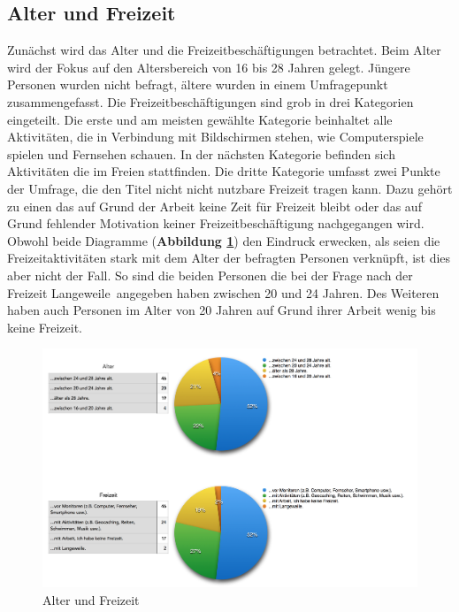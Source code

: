 \subsection{Alter und Freizeit} 
Zunächst wird das Alter und die Freizeitbeschäftigungen betrachtet. Beim Alter wird der Fokus auf den Altersbereich von 16 bis 28 Jahren gelegt. Jüngere Personen wurden nicht befragt, ältere wurden in einem Umfragepunkt zusammengefasst. Die Freizeitbeschäftigungen sind grob in drei Kategorien eingeteilt. Die erste und am meisten gewählte Kategorie beinhaltet alle Aktivitäten, die in Verbindung mit Bildschirmen stehen, wie Computerspiele spielen und Fernsehen schauen. In der nächsten Kategorie befinden sich Aktivitäten die im Freien stattfinden. Die dritte Kategorie umfasst zwei Punkte der Umfrage, die den Titel nicht nicht nutzbare Freizeit tragen kann. Dazu gehört zu einen das auf Grund der Arbeit keine Zeit für Freizeit bleibt oder das auf Grund fehlender Motivation keiner Freizeitbeschäftigung nachgegangen wird. Obwohl beide Diagramme (\textbf{Abbildung \ref{chart:alterFreizeit}}) den Eindruck erwecken, als seien die Freizeitaktivitäten stark mit dem Alter der befragten Personen verknüpft, ist dies aber nicht der Fall. So sind die beiden Personen die bei der Frage nach der Freizeit \glqq Langeweile\grqq\ angegeben haben zwischen 20 und 24 Jahren. Des Weiteren haben auch Personen im Alter von 20 Jahren auf Grund ihrer Arbeit wenig bis keine Freizeit. 

\begin{figure}[H]
    \centering
    \includegraphics[width=1.01\textwidth]{files/umfrage/alterUndFreizeit}
    \caption{Alter und Freizeit}
    \label{chart:alterFreizeit}
\end{figure}


